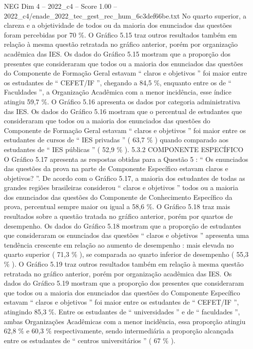 \begin{textsample}{NEG Dim 4 – 2022\_c4 – Score 1.00 – 2022\_c4/enade\_2022\_tec\_gest\_rec\_hum\_6c3def66be.txt}
No quarto superior, a clareza e a objetividade de todos ou da maioria dos enunciados das questões foram percebidas por 70 \%.
O Gráfico 5.15 traz outros resultados também em relação à mesma questão retratada no gráfico anterior, porém por organização acadêmica das IES.
Os dados do Gráfico 5.15 mostram que a proporção dos presentes que consideraram que todos ou a maioria dos enunciados das questões do Componente de Formação Geral estavam “ claros e objetivos ” foi maior entre os estudantes de “ CEFET/IF ”, chegando a 84,5 \%, enquanto entre os de “ Faculdades ”, a Organização Acadêmica com a menor incidência, esse índice atingiu 59,7 \%.
O Gráfico 5.16 apresenta os dados por categoria administrativa das IES.
Os dados do Gráfico 5.16 mostram que o percentual de estudantes que consideraram que todos ou a maioria dos enunciados das questões do Componente de Formação Geral estavam “ claros e objetivos ” foi maior entre os estudantes de cursos de “ IES privadas ” ( 63,7 \% ) quando comparado aos estudantes de “ IES públicas ” ( 52,9 \% ). 5.3.2 COMPONENTE ESPECÍFICO O Gráfico 5.17 apresenta as respostas obtidas para a Questão 5 : “ Os enunciados das questões da prova na parte de Componente Específico estavam claros e objetivos? ”.
De acordo com o Gráfico 5.17, a maioria dos estudantes de todas as grandes regiões brasileiras considerou “ claros e objetivos ” todos ou a maioria dos enunciados das questões do Componente de Conhecimento Específico da prova, percentual sempre maior ou igual a 58,6 \%.
O Gráfico 5.18 traz mais resultados sobre a questão tratada no gráfico anterior, porém por quartos de desempenho.
Os dados do Gráfico 5.18 mostram que a proporção de estudantes que consideraram os enunciados das questões “ claros e objetivos ” apresenta uma tendência crescente em relação ao aumento de desempenho : mais elevada no quarto superior ( 71,3 \% ), se comparada ao quarto inferior de desempenho ( 55,3 \% ).
O Gráfico 5.19 traz outros resultados também em relação à mesma questão retratada no gráfico anterior, porém por organização acadêmica das IES.
Os dados do Gráfico 5.19 mostram que a proporção dos presentes que consideraram que todos ou a maioria dos enunciados das questões do Componente Específico estavam “ claros e objetivos ” foi maior entre os estudantes de “ CEFET/IF ”, atingindo 85,3 \%.
Entre os estudantes de “ universidades ” e de “ faculdades ”, ambas Organizações Acadêmicas com a menor incidência, essa proporção atingiu 62,8 \% e 60,3 \% respectivamente, sendo intermediária a proporção alcançada entre os estudantes de “ centros universitários ” ( 67 \% ).

\end{textsample}
